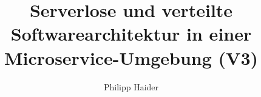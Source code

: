 \documentclass[master,german]{hgbthesis}
\title{Serverlose und verteilte Softwarearchitektur in einer Microservice-Umgebung (V3)}
\author{Philipp Haider}
\begin{document}

\frontmatter                    %

\maketitle
\tableofcontents

%		
%			

\mainmatter          %




%

\appendix                                            %


\MakeBibliography                        %

%

\end{document}
